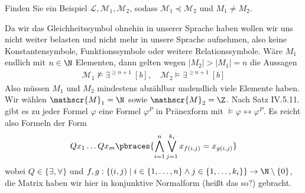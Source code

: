 
\begin{exercise}[143]
Finden Sie ein Beispiel $\mathscr{L},\mathscr{M}_1,\mathscr{M}_2$, sodass
$\mathscr{M}_1 \preccurlyeq \mathscr{M}_2$ und $M_1 \neq M_2$.
\end{exercise}

\begin{solution}
	Da wir das Gleichheitssymbol ohnehin in unserer Sprache haben wollen wir uns nicht weiter belasten und nicht mehr in unsere Sprache aufnehmen, also keine Konstantensymbole, Funktionssymbole oder weitere Relationssymbole. Wäre $M_1$ endlich mit $n \in \N$ Elementen, dann gelten wegen $ |M_2| > |M_1| = n$ die Aussagen
	\begin{align*}
	\mathscr{M}_1 \nvDash \exists^{\geq n + 1} \ [b], \quad \mathscr{M}_2 \vDash \exists^{\geq n + 1} \ [b]
	\end{align*}
	 Also müssen $M_1$ und $M_2$ mindestens abzählbar undendlich viele Elemente haben. Wir wählen $\mathscr{M}_1 = \N$ sowie $\mathscr{M}_2 = \Z$. Nach Satz IV.5.11. gibt es zu jeder Formel $\varphi$ eine Formel $\varphi^P$ in Pränexform mit $\vDash \varphi \leftrightarrow \varphi^P$. Es reicht also Formeln der Form
	 \begin{align*}
	 Qx_1 \dots Qx_m \pbraces{\bigwedge_{i = 1}^n \bigvee_{j = 1}^{k_i} x_{f(i,j)} = x_{g(i,j)} }
	 \end{align*}
	 wobei $Q \in \{\exists, \forall\}$ und $f,g: \{(i,j) \mid i \in \{1, \dots, n\} \land j \in \{1, \dots, k_i\}\} \to \N \setminus\{0\}$, die Matrix haben wir hier in konjunktive Normalform (heißt das so?) gebracht.
\end{solution}
